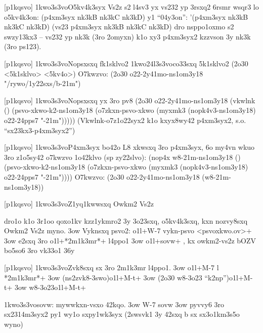 [p1kqsvo]
  \p1kwo3s3vo{O5kv4k3syx}
  Vs2z s2 l4sv3 yx vs232 yp 3rsxq2 6rsmr wsqr3 lo o5kv4k3on:
(p4xm3syx nk3kB nk3kC nk3kD)
  y1 ``04y3on'':
'(p4xm3syx nk3kB nk3kC nk3kD)
(vs23 p4xm3syx nk3kB nk3kC nk3kD)
  dro nsppo1oxmo s2 swzy13kx3 -- vs232 yp nk3k (3ro 2omyxn) k1o xy3
  p4xm3syx2 kzzvson 3y nk3k (3ro ps123).

[p1kqsvo]
  \p1kwo3s3vo{Nopsxsxq fk1sklvo2}
  \p1kwo24l3s3vo{co33sxq 5k1sklvo2}
(2o30 <5k1sklvo> <5kv4o>)
  O7kwzvo:
(2o30 o22-2y41mo-ns1om3y18
      "/rywo/1y22sxs/b-21m")

[p1kqsvo]
  \p1kwo3s3vo{Nopsxsxq yx 3ro pv8}
(2o30 o22-2y41mo-ns1om3y18
   (vkwlnk () (psvo-xkwo-k2-ns1om3y18
         (o7zkxn-psvo-xkwo
           (myxmk3 (nopk4v3-ns1om3y18)
                   o22-24pps7 "-21m")))))
  (Vkwlnk-o7z1o22syx2 k1o kxyx8wy42 p4xm3syx2, s.o. ``sx23kx3-p4xm3syx2'') 


[p1kqsvo]
  \p1kwo3s3vo{P4xm3syx bo42o}
  L8 xkwsxq 3ro p4xm3syx, 6o my4vn wkuo 3ro z1o5sy42 o7kwzvo 1o42klvo
  (sp zy22slvo):
(nop4x w8-21m-ns1om3y18 ()
      (psvo-xkwo-k2-ns1om3y18
         (o7zkxn-psvo-xkwo
           (myxmk3 (nopk4v3-ns1om3y18)
                   o22-24pps7 "-21m"))))
  O7kwzvo:
(2o30 o22-2y41mo-ns1om3y18 (w8-21m-ns1om3y18))

[p1kqsvo]
  \p1kwo3s3vo{Z1yq1kwwsxq Owkm2 Vs2z} 

  dro1o k1o 3r1oo qoxo1kv kzz1ykmro2 3y 3o23sxq, o5kv4k3sxq, kxn
  nozvy8sxq Owkm2 Vs2z myno.
  \s3ow Vyknsxq psvo2:  \5o1l+W-7 vykn-psvo <psvoxkwo.ov>+
  \s3ow e2sxq 3ro \5o1l+*2m1k3mr*+ l4ppo1
  \s3ow \5o1l+sovw+ , kx owkm2-vs2z bOZV
  bo5so6 3ro vk33o1 36y

[p1kqsvo]
  \p1kwo3s3vo{Zvk8sxq sx 3ro 2m1k3mr l4ppo1.}
  \s3ow \5o1l+M-7 l *2m1k3mr*+
  \s3ow (ns2zvk8-3swo)\5o1l+M-t+
  \s3ow (2o30 w8-3o23 ``k2np'')\5o1l+M-t+
  \s3ow w8-3o23\5o1l+M-t+

  \p1kwo3s3vo{sovw: mywwkxn-vsxo 42kqo.}
  \s3ow W-7 sovw
  \s3ow pyvvy6 3ro sx2314m3syx2 py1 wy1o sxpy1wk3syx (2swsvk1 3y 42sxq
    b sx sx3o1km3s5o wyno)

